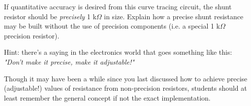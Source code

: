 

If quantitative accuracy is desired from this curve tracing circuit, the shunt resistor should be {\it precisely} 1 k$\Omega$ in size.  Explain how a precise shunt resistance may be built without the use of precision components (i.e. a special 1 k$\Omega$ precision resistor).







Hint: there's a saying in the electronics world that goes something like this: {\it "Don't make it precise, make it adjustable!"} 







Though it may have been a while since you last discussed how to achieve precise (adjustable!) values of resistance from non-precision resistors, students should at least remember the general concept if not the exact implementation.



